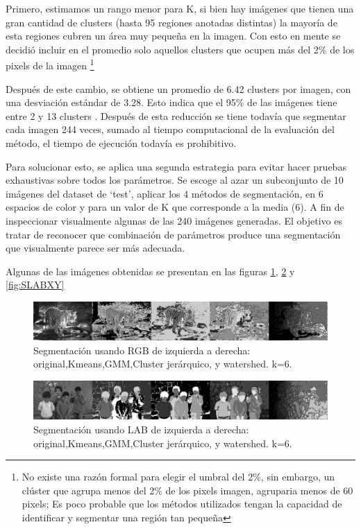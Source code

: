\documentclass[10pt,twocolumn,letterpaper]{article}
\begin{document}
Primero, estimamos un rango menor para K, si bien hay imágenes que tienen una gran cantidad de clusters (hasta 95 regiones anotadas distintas) la mayoría de esta regiones cubren un área muy pequeña en la imagen. Con esto en mente se decidió incluir en el promedio solo aquellos clusters que ocupen más del 2\% de los pixels de la imagen \footnote{No existe una razón formal para elegir el umbral del 2\%, sin embargo, un clúster que agrupa menos del 2\% de los pixels imagen, agruparia menos de 60 pixels; Es poco probable que los métodos utilizados tengan la capacidad de identificar y segmentar una región tan pequeña}

Después de este cambio, se obtiene un promedio de 6.42 clusters por imagen, con una desviación estándar de 3.28. Esto indica que el 95\% de las imágenes tiene entre 2 y  13 clusters . Después de esta reducción se tiene todavía que segmentar cada imagen 244 veces, sumado al tiempo computacional de la evaluación del método, el tiempo de ejecución todavía es prohibitivo.

Para solucionar esto, se aplica una segunda estrategia para evitar hacer pruebas exhaustivas sobre todos los parámetros. Se escoge al azar un subconjunto de 10 imágenes del dataset de ‘test’, aplicar los 4 métodos de segmentación, en 6 espacios de color y para un valor de K que corresponde a  la media (6). A fin de inspeccionar visualmente algunas de las 240 imágenes generadas. El objetivo es tratar de reconocer que combinación de parámetros produce una segmentación que visualmente parece ser más adecuada.

Algunas de las imágenes obtenidas se presentan en las figuras \ref{fig:sRGB}, \ref{fig:SLAB} y \ref{fig:SLABXY}


\begin{figure}
\begin{center}
\includegraphics[width=0.95\linewidth]
                 {img/RGSample.jpg}
\end{center}
 \caption{Segmentación usando RGB de izquierda a derecha: original,Kmeans,GMM,Cluster jerárquico, y watershed. k=6.}
\label{fig:sRGB}
\end{figure}

\begin{figure}
\begin{center}
\includegraphics[width=0.95\linewidth]
                 {img/LABSample.jpg}
\end{center}
 \caption{Segmentación usando LAB de izquierda a derecha: original,Kmeans,GMM,Cluster jerárquico, y watershed. k=6.}
\label{fig:SLAB}
\end{figure}
\end{document}
